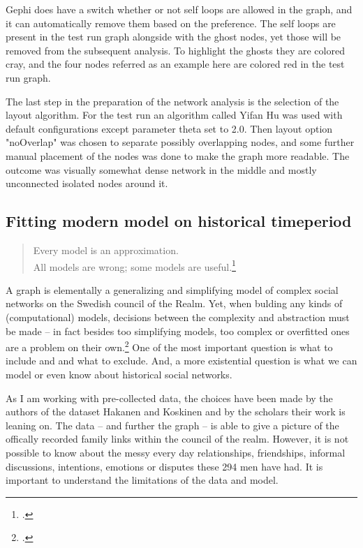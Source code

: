 Gephi does have a switch whether or not self loops are allowed in the graph, and it can automatically remove them based on the preference. The self loops are present in the test run graph alongside with the ghost nodes, yet those will be removed from the subsequent analysis. To highlight the ghosts they are colored cray, and the four nodes referred as an example here are colored red in the test run graph.

The last step in the preparation of the network analysis is the selection of the layout algorithm. For the test run an algorithm called Yifan Hu was used with default configurations except parameter theta set to 2.0. Then layout option "noOverlap" was chosen to separate possibly overlapping nodes, and some further manual placement of the nodes was done to make the graph more readable. The outcome was visually somewhat dense network in the middle and mostly unconnected isolated nodes around it. 

\subsection{Fitting modern model on historical timeperiod}
\begin{quote}
	Every model is an approximation.\\
	All models are wrong; some models are useful.\footcite[prefix]{statisticsfor}
\end{quote}

A graph is elementally a generalizing and simplifying model of complex social networks on the Swedish council of the Realm. Yet, when bulding any kinds of (computational) models, decisions between the complexity and abstraction must be made – in fact besides too simplifying models, too complex or overfitted ones are a problem on their own.\footcite{TODO} One of the most important question is what to include and and what to exclude. And, a more existential question is what we can model or even know about historical social networks. 

As I am working with pre-collected data, the choices have been made by the authors of the dataset Hakanen and Koskinen and by the scholars their work is leaning on. The data – and further the graph – is able to give a picture of the offically recorded family links within the council of the realm. However, it is not possible to know about the messy every day relationships, friendships, informal discussions, intentions, emotions or disputes these 294 men have had. It is important to understand the limitations of the data and model.

